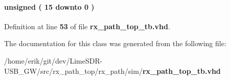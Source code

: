 \paragraph[{wrreq\+\_\+cnt\+\_\+max}]{ {\bfseries \textcolor{comment}{unsigned}\textcolor{vhdlchar}{ }\textcolor{vhdlchar}{(}\textcolor{vhdlchar}{ }\textcolor{vhdlchar}{ } \textcolor{vhdldigit}{15} \textcolor{vhdlchar}{ }\textcolor{keywordflow}{downto}\textcolor{vhdlchar}{ }\textcolor{vhdlchar}{ } \textcolor{vhdldigit}{0} \textcolor{vhdlchar}{ }\textcolor{vhdlchar}{)}\textcolor{vhdlchar}{ }} \hspace{0.3cm}{\ttfamily [Signal]}}\label{classrx__path__top__tb_1_1tb__behave_aa1fc1745ae041f9b69c7289c7a191699}


Definition at line {\bf 53} of file {\bf rx\+\_\+path\+\_\+top\+\_\+tb.\+vhd}.



The documentation for this class was generated from the following file\+:\begin{DoxyCompactItemize}
\item 
/home/erik/git/dev/\+Lime\+S\+D\+R-\/\+U\+S\+B\+\_\+\+G\+W/src/rx\+\_\+path\+\_\+top/rx\+\_\+path/sim/{\bf rx\+\_\+path\+\_\+top\+\_\+tb.\+vhd}\end{DoxyCompactItemize}
